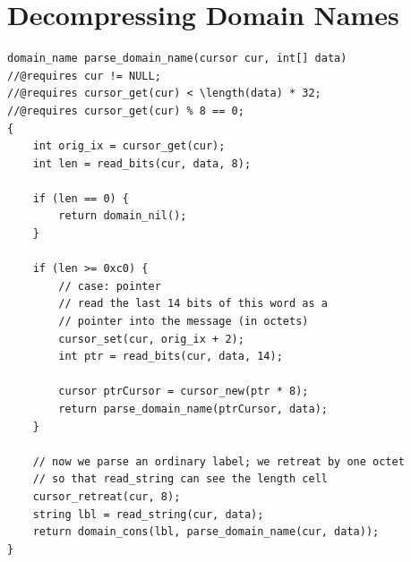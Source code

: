 \documentclass{article}
\begin{document}
\section{Decompressing Domain Names}\label{appendix:decompression}

\begin{lstlisting}
domain_name parse_domain_name(cursor cur, int[] data)
//@requires cur != NULL;
//@requires cursor_get(cur) < \length(data) * 32;
//@requires cursor_get(cur) % 8 == 0;
{
    int orig_ix = cursor_get(cur);
    int len = read_bits(cur, data, 8);

    if (len == 0) {
        return domain_nil();
    }

    if (len >= 0xc0) {
        // case: pointer
        // read the last 14 bits of this word as a
        // pointer into the message (in octets)
        cursor_set(cur, orig_ix + 2);
        int ptr = read_bits(cur, data, 14);

        cursor ptrCursor = cursor_new(ptr * 8);
        return parse_domain_name(ptrCursor, data);
    }

    // now we parse an ordinary label; we retreat by one octet
    // so that read_string can see the length cell
    cursor_retreat(cur, 8);
    string lbl = read_string(cur, data);
    return domain_cons(lbl, parse_domain_name(cur, data));
}
\end{lstlisting}
\end{document}
